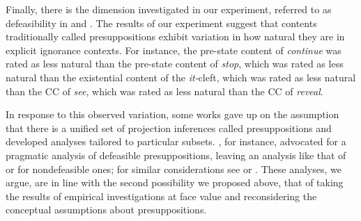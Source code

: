 \documentclass[11pt,fleqn]{article}
\newcommand{\6}{\mbox{$[\hspace*{-.6mm}[$}}
\newcommand{\9}{\mbox{$]\hspace*{-.6mm}]$}}
\begin{document}
Finally, there is the dimension investigated in our experiment, referred to as defeasibility in \citealt{simons01} and \citealt{abusch10}. The results of our experiment suggest that contents traditionally called presuppositions exhibit variation in how natural they are in explicit ignorance contexts. For instance,  the pre-state content of {\em continue} was rated as less natural than the pre-state content of {\em stop}, which was rated as less natural than the existential content of the {\em it-}cleft, which was rated as less natural than the CC of {\em see}, which was rated as less natural than the CC of {\em reveal}. 

In response to this observed variation, some works gave up on the assumption that there is a unified set of projection inferences called presuppositions and developed analyses tailored to particular subsets. \citealt{abusch10}, for instance, advocated for a pragmatic analysis of defeasible presuppositions, leaving an analysis like that of \citealt{heim83} or \citealt{vds92} for nondefeasible ones; for similar considerations see \citealt{abrusan2011} or \citealt{romoli2015}. These analyses, we argue, are in line with the second possibility we proposed above, that of taking the results of empirical investigations at face value and reconsidering the conceptual assumptions about presuppositions. 

\end{document}
